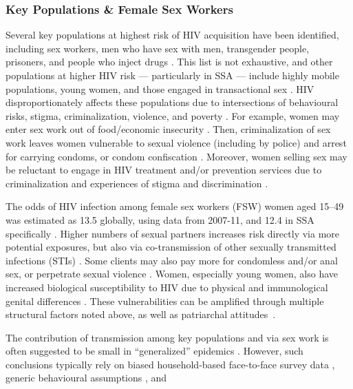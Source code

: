 \subsubsection{Key Populations \& Female Sex Workers}\label{intro.hiv.epi.kp}
Several key populations at highest risk of HIV acquisition have been identified, including
sex workers, men who have sex with men, transgender people, prisoners, and people who inject drugs
\cite{Mathers2008,Beyrer2012,Baral2012,Scorgie2012,Shannon2015,Rubenstein2016,WHO2016kp,Jin2021}.
This list is not exhaustive, and other populations at higher HIV risk --- particularly in SSA ---
include highly mobile populations, young women, and those engaged in transactional sex
\cite{Oldenburg2014,Wamoyi2016,Camlin2019,Cheuk2020,Day2020,Khalifa2022}.
HIV disproportionately affects these populations due to intersections of
behavioural risks, stigma, criminalization, violence, and poverty \cite{WHO2016kp}.
For example, women may enter sex work out of food/economic insecurity \cite{Scorgie2012}.
Then, criminalization of sex work leaves women vulnerable to sexual violence (including by police)
and arrest for carrying condoms, or condom confiscation \cite{Scorgie2012,Shannon2015}.
Moreover, women selling sex may be reluctant to engage in HIV treatment and/or prevention services
due to criminalization and experiences of stigma and discrimination \cite{Lancaster2016,Spyrelis2022}.
\par
The odds of HIV infection among female sex workers (FSW)
\vs women aged 15--49 was estimated as 13.5 globally, using data from 2007-11,
and 12.4 in SSA specifically \cite{Baral2012}.
Higher numbers of sexual partners increases risk directly via more potential exposures,
but also via co-transmission of other sexually transmitted infections (STIs) \cite{Scorgie2012}.
Some clients may also pay more for condomless and/or anal sex,
or perpetrate sexual violence \cite{Scorgie2012,Shannon2015}.
Women, especially young women, also have increased biological susceptibility to HIV
due to physical and immunological genital differences \cite{Yi2013}.
These vulnerabilities can be amplified through multiple structural factors noted above,
as well as patriarchal attitudes~\cite{Scorgie2012,Shannon2015}.
\par
The contribution of transmission among key populations and via sex work
is often suggested to be small in ``generalized'' epidemics \cite{Leclerc2008,Shubber2014}.
However, such conclusions typically rely on
biased household-based face-to-face survey data \cite{Langhaug2010,Lowndes2012},
generic behavioural assumptions \cite{Shubber2014}, and
